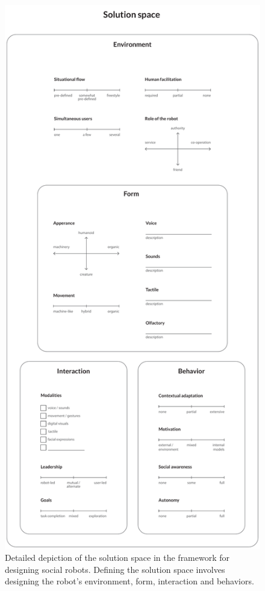  \begin{figure}
 \centering
  \includegraphics[scale=0.4]{images/solution_v4-01.pdf}
  \caption{Detailed depiction of the solution space in the framework for designing social robots. Defining the solution space involves designing the robot's environment, form, interaction and behaviors.}
  \label{fig:solution}
\end{figure}


